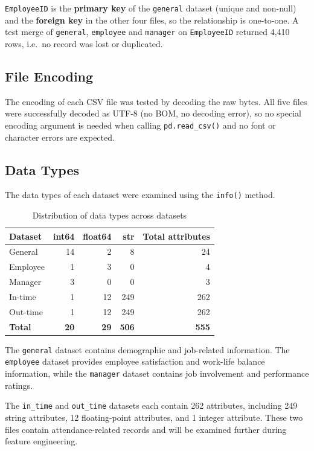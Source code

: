 \documentclass[12pt,a4paper]{article}
\begin{document}
\texttt{EmployeeID} is the \textbf{primary key} of the \texttt{general}
dataset (unique and non-null) and the \textbf{foreign key} in the other
four files, so the relationship is one-to-one. A test merge of
\texttt{general}, \texttt{employee} and \texttt{manager} on
\texttt{EmployeeID} returned 4,410 rows, i.e.\ no record was lost
or duplicated.

\subsection{File Encoding}

The encoding of each CSV file was tested by decoding the raw bytes.
All five files were successfully decoded as UTF-8 (no BOM, no decoding
error), so no special encoding argument is needed when calling
\texttt{pd.read\_csv()} and no font or character errors are expected.

\subsection{Data Types}

The data types of each dataset were examined using the
\texttt{info()} method.

\begin{table}[H]
\centering
\caption{Distribution of data types across datasets}
\label{tab:data-types}
\small
\begin{tabular}{lrrrr}
\toprule
\textbf{Dataset}
& \textbf{int64}
& \textbf{float64}
& \textbf{str}
& \textbf{Total attributes}\\
\midrule
General & 14 & 2 & 8 & 24\\
Employee & 1 & 3 & 0 & 4\\
Manager & 3 & 0 & 0 & 3\\
In-time & 1 & 12 & 249 & 262\\
Out-time & 1 & 12 & 249 & 262\\
\midrule
\textbf{Total} & \textbf{20} & \textbf{29}
& \textbf{506} & \textbf{555}\\
\bottomrule
\end{tabular}
\end{table}

The \texttt{general} dataset contains demographic and job-related
information. The \texttt{employee} dataset provides employee
satisfaction and work-life balance information, while the
\texttt{manager} dataset contains job involvement and
performance ratings.

The \texttt{in\_time} and \texttt{out\_time} datasets each
contain 262 attributes, including 249 string attributes,
12 floating-point attributes, and 1 integer attribute.
These two files contain attendance-related records and will
be examined further during feature engineering.
\end{document}
